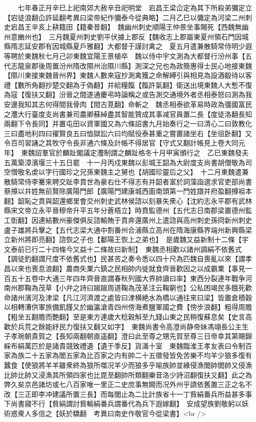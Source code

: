 　　七年春正月辛巳上祀南郊大赦辛丑祀明堂　宕昌王梁仚定為其下所殺弟彌定立【宕徒浪翻仚許延翻考異曰梁帝紀作彌泰今從典略】二月乙巳以彌定為河梁二州刺史宕昌王辛亥上耕籍田【籍秦昔翻】　魏幽州刺史順陽王仲景坐事賜死【西魏無幽州意豳州也】　三月魏夏州刺史劉平伏據上郡反【魏收志上郡屬東夏州領石門因城縣隋志延安郡有因城縣夏戶雅翻】大都督于謹討禽之　夏五月遣兼散騎常侍明少遐等聘於東魏秋七月己卯東魏宜陽王景植卒　魏以侍中宇文測為大都督行汾州事【五代志龍泉郡後周置汾州隋改隰州治隰川縣】測深之兄也為政簡惠得士民心地接東魏【隰川東接東魏晉州界】東魏人數來寇抄測禽獲之命解縛引與相見為設酒殽待以客禮【數所角翻抄楚交翻為于偽翻】并給糧餼【餼許氣翻】衛送出境東魏人大慙不復為寇【復扶又翻】汾晉之間遂通慶弔時論稱之或告測交通境外者丞相泰怒曰測為我安邊我知其志何得間我骨肉【間古莧翻】命斬之　魏丞相泰欲革易時政為彊國富民之灋大行臺度支尚書兼司農卿蘇綽盡其智能贊成其事减官員置二長【度徒洛翻長知兩翻下令長同】并置屯田以資軍國又為六條詔書九月始奏行之一曰清心二曰敦教化三曰盡地利四曰擢賢良五曰恤獄訟六曰均賦役泰甚重之嘗置諸坐右【坐徂卧翻】又令百司習誦之其牧守令長非通六條及計帳不得居官【守式又翻計帳見上卷大同元年】　東魏詔羣官於麟趾閣議定灋制謂之麟趾格冬十月甲寅頒行之　乙巳東魏發夫五萬築漳濱堰三十五日罷　十一月丙戍東魏以彭城王韶為大尉度支尚書胡僧敬為司空僧敬名䖍以字行國珍之兄孫東魏主之舅也【胡國珍靈后之父】　十二月東魏遣兼散騎常侍李騫來聘交趾李賁世為豪右仕不得志有并韶者富於詞藻詣選求官吏部尚書蔡撙以并姓無前賢除廣陽門郎【廣陽門建康城西面南頭第一門姓譜并府盈翻撙祖本翻】韶恥之賁與韶還鄉里會交州刺史武林侯諮以刻暴失衆心【沈約志永平郡有武林縣宋文帝立永平晉穆帝升平五年分蒼梧立】時賁監德州【五代志日南郡梁置德州監工衘翻】因連結數州豪傑俱反諮輸賄于賁奔還廣州上遣諮與高州刺史孫冏新州刺史盧子雄將兵擊之【五代志梁大通中割番州合浦縣立高州在隋海康縣界端州新興縣梁立新州將即亮翻】諮恢之子也【鄱陽王恢上之弟也】　是歲魏又益新制十二條【宇文泰前已行二十四條今又益十二條故曰新制】　東魏丞相歡以諸州調絹不依舊式【調徒釣翻謂尺度不依舊式也】民甚苦之奏令悉以四十尺為匹魏自喪亂以來【謂孝昌以來也喪息浪翻】農商失業六鎮之民相帥内徙就食齊晉歡因之以成霸業【事見一百五十五卷中大通三年四年齊晉直謂春秋列國大界帥讀曰率】東西分裂連年戰争河南州郡鞠為茂草【小弁之詩曰踧踧周道鞠為茂革注云鞠窮也】公私困竭民多餓死歡命諸州濱河及津梁【凡江河濟渡之處皆曰津横絶水為橋以通往來曰梁】皆置倉積穀以相轉漕供軍旅備飢饉又於幽瀛滄青四州傍海煮鹽軍國之費【傍步浪翻】粗得周贍【粗坐五翻贍而艶翻】至是東方連歲大稔穀斛至九錢山東之民稍復蘇息矣【史言高歡於兵荒之餘能紓民力復扶又翻又如字】　東魏尚書令高澄尚静帝妹馮翊長公主生子孝琬朝貴賀之【長知兩翻朝直遥翻】澄曰此至尊之甥先賀至尊三日帝幸其第賜錦綵布絹萬匹於是諸貴競致禮遺【遺于季反】貨滿十室　東魏臨淮王孝友表曰令制百家為族二十五家為閭五家為比百家之内有帥二十五徵發皆免苦樂不均羊少狼多復有蠶食【使狼將羊羊雖衆終為狼所噬况羊少而狼多乎喻族帥並緣侵漁閭帥閭帥又侵漁比帥比帥又浸漁其所領四家也比毘至翻帥所類翻樂音洛少詩沼翻復扶又翻】此之為弊久矣京邑諸坊或七八百家唯一里正二史庶事無闕而况外州乎請依舊置三正之名不改【三正即李冲建議所置三長】而每閭止為二比計族省十一丁貲絹番兵所益甚多事下尚書寢不行【貲絹謂討貲輸絹番兵謂番代為兵下遐嫁翻】　安成望族劉敬躬以妖術惑衆人多信之【妖於驕翻　考異曰南史作敬官今從梁書】<br />
